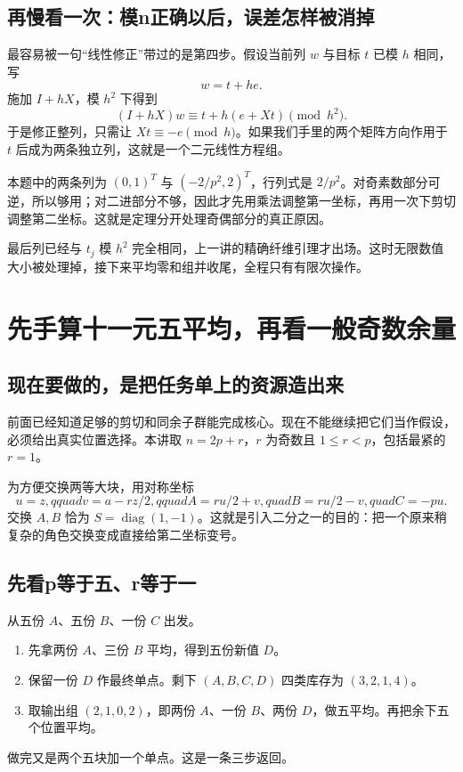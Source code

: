 \documentclass[11pt,a4paper,oneside,openany]{book}
\newcommand{\diag}{\operatorname{diag}}
\theoremstyle{definition}
\numberwithin{equation}{chapter}
\begin{document}
\section{再慢看一次：模n正确以后，误差怎样被消掉}
最容易被一句“线性修正”带过的是第四步。假设当前列 $w$ 与目标 $t$ 已模 $h$ 相同，写
\[w=t+he.
\]
施加 $I+hX$，模 $h^2$ 下得到
\[(I+hX)w\equiv t+h(e+Xt)\pmod{h^2}.
\]
于是修正整列，只需让 $Xt\equiv-e\pmod h$。如果我们手里的两个矩阵方向作用于 $t$ 后成为两条独立列，这就是一个二元线性方程组。

本题中的两条列为 $(0,1)^T$ 与 $(-2/p^2,2)^T$，行列式是 $2/p^2$。对奇素数部分可逆，所以够用；对二进部分不够，因此才先用乘法调整第一坐标，再用一次下剪切调整第二坐标。这就是定理分开处理奇偶部分的真正原因。

最后列已经与 $t_j$ 模 $h^2$ 完全相同，上一讲的精确纤维引理才出场。这时无限数值大小被处理掉，接下来平均零和组并收尾，全程只有有限次操作。

\chapter{先手算十一元五平均，再看一般奇数余量}\label{ch:odd}
\section{现在要做的，是把任务单上的资源造出来}
前面已经知道足够的剪切和同余子群能完成核心。现在不能继续把它们当作假设，必须给出真实位置选择。本讲取 $n=2p+r$，$r$ 为奇数且 $1\le r<p$，包括最紧的 $r=1$。

为方便交换两等大块，用对称坐标
\[u=z,qquad v=a-rz/2,qquad
A=ru/2+v,quad B=ru/2-v,quad C=-pu.
\]
交换 $A,B$ 恰为 $S=\diag(1,-1)$。这就是引入二分之一的目的：把一个原来稍复杂的角色交换变成直接给第二坐标变号。

\section{先看p等于五、r等于一}
从五份 $A$、五份 $B$、一份 $C$ 出发。
\begin{enumerate}
\item 先拿两份 $A$、三份 $B$ 平均，得到五份新值 $D$。
\item 保留一份 $D$ 作最终单点。剩下 $(A,B,C,D)$ 四类库存为 $(3,2,1,4)$。
\item 取输出组 $(2,1,0,2)$，即两份 $A$、一份 $B$、两份 $D$，做五平均。再把余下五个位置平均。
\end{enumerate}
做完又是两个五块加一个单点。这是一条三步返回。
\end{document}
